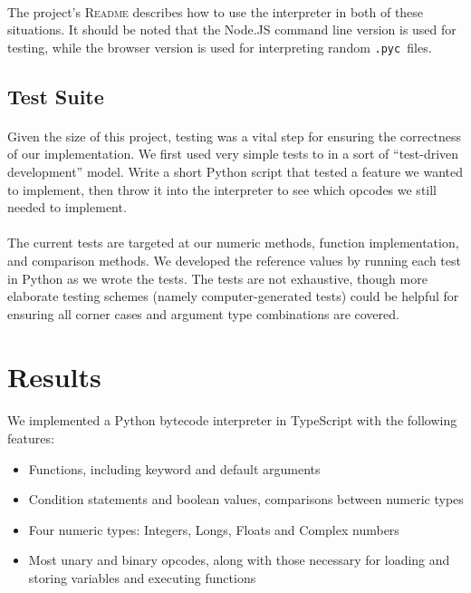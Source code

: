 \documentclass{article}
\newcommand{\pyc}{\texttt{.pyc~}}
\begin{document}
\paragraph{}
The project's \textsc{Readme} describes how to use the interpreter in both of these situations. It should be noted that the Node.JS command line version is used for testing, while the browser version is used for interpreting random \pyc files.

\subsection{Test Suite}

\paragraph{}
Given the size of this project, testing was a vital step for ensuring the correctness of our implementation. We first used very simple tests to in a sort of ``test-driven development'' model. Write a short Python script that tested a feature we wanted to implement, then throw it into the interpreter to see which opcodes we still needed to implement.

\paragraph{}
The current tests are targeted at our numeric methods, function implementation, and comparison methods. We developed the reference values by running each test in Python as we wrote the tests. The tests are not exhaustive, though more elaborate testing schemes (namely computer-generated tests) could be helpful for ensuring all corner cases and argument type combinations are covered.

\section{Results}\label{results}

\paragraph{}
We implemented a Python bytecode interpreter in TypeScript with the following features:

\begin{itemize}
  \item Functions, including keyword and default arguments
  \item Condition statements and boolean values, comparisons between numeric types
  \item Four numeric types: Integers, Longs, Floats and Complex numbers
  \item Most unary and binary opcodes, along with those necessary for loading and storing variables and executing functions
\end{itemize}
\end{document}
